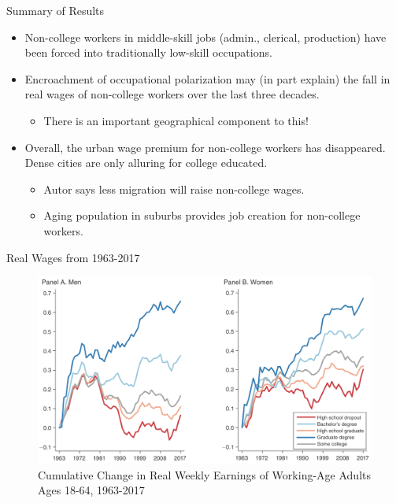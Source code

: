 \documentclass{beamer}
\begin{document}
\begin{frame}{Summary of Results}

\begin{itemize}
	
	\item Non-college workers in middle-skill jobs (admin., clerical, production) have been forced into traditionally low-skill occupations.
	
	\bigskip
	
	\item Encroachment of occupational polarization may (in part explain) the fall in real wages of non-college workers over the last three decades.
	\begin{itemize}
		\item There is an important geographical component to this!
	\end{itemize}

	\bigskip
	
	\item Overall, the urban wage premium for non-college workers has disappeared. Dense cities are only alluring for college educated.
	\begin{itemize}
		\item Autor says less migration will raise non-college wages.
		\item Aging population in suburbs provides job creation for non-college workers.
	\end{itemize}

	
\end{itemize}

\end{frame}


\begin{frame}{Real Wages from 1963-2017}

\begin{figure}
	\begin{center}
		\includegraphics[scale=0.25]{Figures/Fig1_RealWages}
		\caption{Cumulative Change in Real Weekly Earnings of Working-Age Adults Ages 18-64, 1963-2017}
	\end{center}

\end{figure}

\end{frame}
\end{document}
